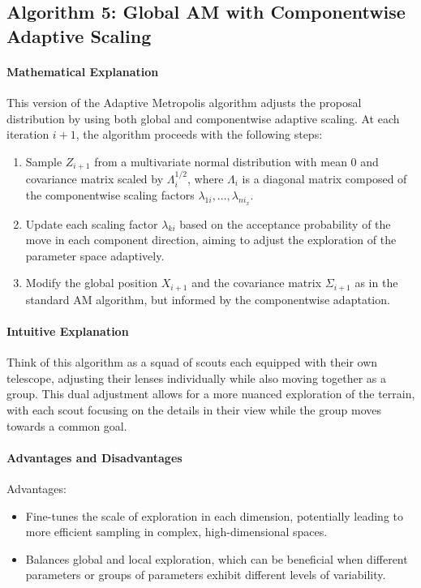 \documentclass{article}
\begin{document}
\subsection{Algorithm 5: Global AM with Componentwise Adaptive Scaling}

\paragraph{Mathematical Explanation}
This version of the Adaptive Metropolis algorithm adjusts the proposal distribution by using both global and componentwise adaptive scaling. At each iteration \(i+1\), the algorithm proceeds with the following steps:
\begin{enumerate}
    \item Sample \( Z_{i+1} \) from a multivariate normal distribution with mean 0 and covariance matrix scaled by \( \Lambda_i^{1/2} \), where \( \Lambda_i \) is a diagonal matrix composed of the componentwise scaling factors \( \lambda_{1i}, \ldots, \lambda_{ni_x} \).
    \item Update each scaling factor \( \lambda_{ki} \) based on the acceptance probability of the move in each component direction, aiming to adjust the exploration of the parameter space adaptively.
    \item Modify the global position \( X_{i+1} \) and the covariance matrix \( \Sigma_{i+1} \) as in the standard AM algorithm, but informed by the componentwise adaptation.
\end{enumerate}

\paragraph{Intuitive Explanation}
Think of this algorithm as a squad of scouts each equipped with their own telescope, adjusting their lenses individually while also moving together as a group. This dual adjustment allows for a more nuanced exploration of the terrain, with each scout focusing on the details in their view while the group moves towards a common goal.

\paragraph{Advantages and Disadvantages}
Advantages:
\begin{itemize}
    \item Fine-tunes the scale of exploration in each dimension, potentially leading to more efficient sampling in complex, high-dimensional spaces.
    \item Balances global and local exploration, which can be beneficial when different parameters or groups of parameters exhibit different levels of variability.
\end{itemize}
\end{document}
